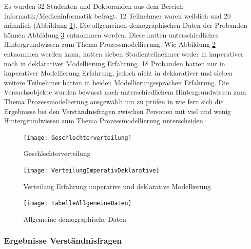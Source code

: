 Es wurden 32 Studenten und Doktoranden aus dem Bereich Informatik/Medieninformatik befragt. 12 Teilnehmer waren weiblich und 20 männlich (Abbildung \ref{fig:Geschlechterverteilung}). Die allgemeinen demographischen Daten der Probanden können Abbildung \ref{fig:TabelleAllgemeineDaten} entnommen werden. Diese hatten unterschiedliches Hintergrundwissen zum Thema Prozessmodellierung. Wie Abbildung \ref{fig:VerteilungImperativDeklarative} entnommen werden kann, hatten sieben Studienteilnehmer weder in imperativer noch in deklarativer Modellierung Erfahrung. 18 Probanden hatten nur in imperativer Modellierung Erfahrung, jedoch nicht in deklarativer und sieben weitere Teilnehmer hatten in beiden Modellierungssprachen Erfahrung. Die Versuchsobjekte wurden bewusst nach unterschiedlichem Hintergrundwissen zum Thema Prozessmodellierung ausgewählt um zu prüfen in wie fern sich die Ergebnisse bei den Verständnisfragen zwischen Personen mit viel und wenig Hintergrundwissen zum Thema Prozessmodellierung unterscheiden.\newline

\begin{figure}[htp]
\begin{center}
  \texttt{[image: Geschlechterverteilung]} %
  \caption{Geschlechterverteilung}
  \label{fig:Geschlechterverteilung}
\end{center}
\end{figure}

\begin{figure}[htp]
\begin{center}
  \texttt{[image: VerteilungImperativDeklarative]} %
  \caption{Verteilung Erfahrung imperative und deklarative Modellierung}
  \label{fig:VerteilungImperativDeklarative}
\end{center}
\end{figure}

\begin{figure}[htp]
\begin{center}
  \texttt{[image: TabelleAllgemeineDaten]} %
  \caption{Allgemeine demographische Daten}
  \label{fig:TabelleAllgemeineDaten}
\end{center}
\end{figure}



\subsubsection{Ergebnisse Verständnisfragen}

